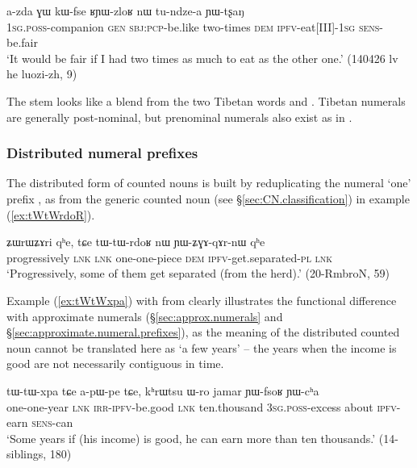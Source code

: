 \begin{exe}
\ex \label{ex:RYizloR}
\gll a-zda ɣɯ kɯ-fse ʁɲɯ-zloʁ nɯ tu-ndze-a ɲɯ-tʂaŋ \\
 \textsc{1sg}.\textsc{poss}-companion \textsc{gen} \textsc{sbj}:\textsc{pcp}-be.like two-times \textsc{dem} \textsc{ipfv}-eat[III]-\textsc{1sg} \textsc{sens}-be.fair \\
\glt `It would be fair if I had two times as much to eat as the other one.' (140426 lv he luozi-zh, 9)
\end{exe}

The stem  looks like a blend from the two Tibetan words  and . Tibetan numerals are generally post-nominal, but prenominal numerals also exist as in .

\subsubsection{Distributed numeral prefixes} \label{sec:numeral.prefixes.distributed}
The distributed form of counted nouns is built by reduplicating the numeral `one' prefix , as  from the generic counted noun  (see §\ref{sec:CN.classification}) in example (\ref{ex:tWtWrdoR}).

\begin{exe}
\ex  \label{ex:tWtWrdoR}
\gll ʑɯrɯʑɤri qʰe, tɕe tɯ-tɯ-rdoʁ nɯ ɲɯ-ʑɣɤ-qɤr-nɯ qʰe \\
 progressively \textsc{lnk} \textsc{lnk} one-one-piece \textsc{dem} \textsc{ipfv}-get.separated-\textsc{pl} \textsc{lnk} \\
\glt `Progressively, some of them get separated (from the herd).' (20-RmbroN, 59)
\end{exe}

Example (\ref{ex:tWtWxpa}) with  from  clearly illustrates the functional difference with approximate numerals (§\ref{sec:approx.numerals} and §\ref{sec:approximate.numeral.prefixes}), as the meaning of the distributed counted noun cannot be translated here as `a few years' -- the years when the income is good are not necessarily contiguous in time.

\begin{exe}
\ex  \label{ex:tWtWxpa}
\gll   tɯ-tɯ-xpa tɕe a-pɯ-pe tɕe, kʰrɯtsu ɯ-ro jamar ɲɯ-fsoʁ ɲɯ-cʰa \\
one-one-year  \textsc{lnk} \textsc{irr}-\textsc{ipfv}-be.good \textsc{lnk} ten.thousand \textsc{3sg}.\textsc{poss}-excess about \textsc{ipfv}-earn \textsc{sens}-can \\ 
\glt `Some years if (his income) is good, he can earn more than ten thousands.' (14-siblings, 180)
\end{exe}

